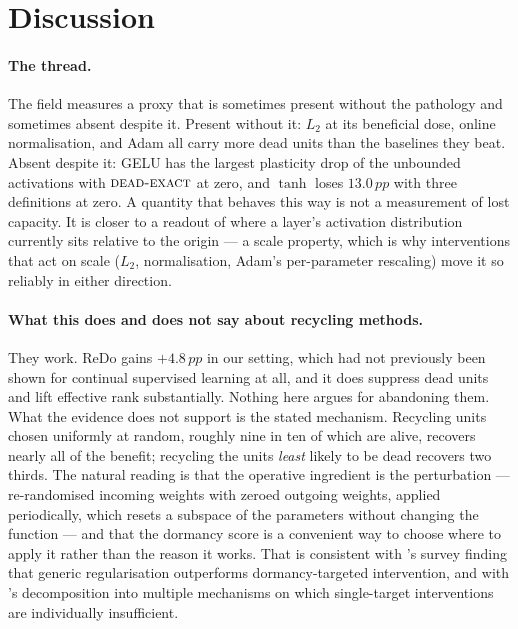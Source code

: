 \documentclass[10pt]{article}
\newcommand{\dexact}{\textsc{dead-exact}}
\newcommand{\pp}{\,pp}
\begin{document}
\section{Discussion}
\label{sec:discussion}

\paragraph{The thread.} The field measures a proxy that is sometimes present
without the pathology and sometimes absent despite it. Present without it: $L_2$
at its beneficial dose, online normalisation, and Adam all carry more dead units
than the baselines they beat. Absent despite it: GELU has the largest plasticity
drop of the unbounded activations with $\dexact$ at zero, and $\tanh$ loses
$13.0\pp$ with three definitions at zero. A quantity that behaves this way is not
a measurement of lost capacity. It is closer to a readout of where a layer's
activation distribution currently sits relative to the origin --- a scale
property, which is why interventions that act on scale ($L_2$, normalisation,
Adam's per-parameter rescaling) move it so reliably in either direction.

\paragraph{What this does and does not say about recycling methods.} They work.
ReDo gains $+4.8\pp$ in our setting, which had not previously been shown for
continual supervised learning at all, and it does suppress dead units and lift
effective rank substantially. Nothing here argues for abandoning them. What the
evidence does not support is the stated mechanism. Recycling units chosen
uniformly at random, roughly nine in ten of which are alive, recovers nearly all
of the benefit; recycling the units \emph{least} likely to be dead recovers two
thirds. The natural reading is that the operative ingredient is the
perturbation --- re-randomised incoming weights with zeroed outgoing weights,
applied periodically, which resets a subspace of the parameters without changing
the function --- and that the dormancy score is a convenient way to choose where
to apply it rather than the reason it works. That is consistent with
\citet{klein2024plasticity}'s survey finding that generic regularisation
outperforms dormancy-targeted intervention, and with
\citet{lyle2024disentangling}'s decomposition into multiple mechanisms on which
single-target interventions are individually insufficient.
\end{document}
